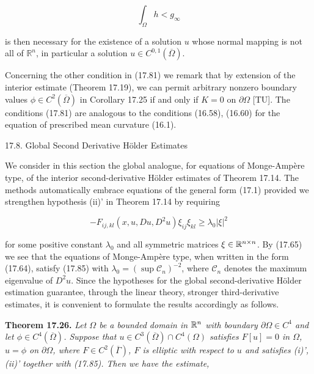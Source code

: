\begin{equation}
\tag{17.84}
\int_{\Omega} h < g_{\infty}
\end{equation}

is then necessary for the existence of a solution $u$ whose normal mapping is not all of $\mathbb{R}^n$, in particular a solution $u \in C^{0,1}(\overline{\Omega})$.

Concerning the other condition in (17.81) we remark that by extension of the interior estimate (Theorem 17.19), we can permit arbitrary nonzero boundary values $\phi \in C^2(\overline{\Omega})$ in Corollary 17.25 if and only if $K = 0$ on $\partial \Omega$ [TU]. The conditions (17.81) are analogous to the conditions (16.58), (16.60) for the equation of prescribed mean curvature (16.1).



17.8. Global Second Derivative Hölder Estimates

We consider in this section the global analogue, for equations of Monge-Ampère type, of the interior second-derivative Hölder estimates of Theorem 17.14. The methods automatically embrace equations of the general form (17.1) provided we strengthen hypothesis (ii)' in Theorem 17.14 by requiring

\begin{equation}
\tag{17.85}
-F_{ij,kl}(x,u,Du,D^2u)\xi_{ij}\xi_{kl} \geq \lambda_0|\xi|^2
\end{equation}

for some positive constant $\lambda_0$ and all symmetric matrices $\xi \in \mathbb{R}^{n \times n}$. By (17.65) we see that the equations of Monge-Ampère type, when written in the form (17.64), satisfy (17.85) with $\lambda_0 = (\sup \mathcal{C}_n)^{-2}$, where $\mathcal{C}_n$ denotes the maximum eigenvalue of $D^2u$. Since the hypotheses for the global second-derivative Hölder estimation guarantee, through the linear theory, stronger third-derivative estimates, it is convenient to formulate the results accordingly as follows.

\textbf{Theorem 17.26.} \emph{Let $\Omega$ be a bounded domain in $\mathbb{R}^n$ with boundary $\partial\Omega \in C^4$ and let $\phi \in C^4(\overline{\Omega})$. Suppose that $u \in C^3(\overline{\Omega}) \cap C^4(\Omega)$ satisfies $F[u] = 0$ in $\Omega$, $u = \phi$ on $\partial\Omega$, where $F \in C^2(\overline{\Gamma})$, $F$ is elliptic with respect to $u$ and satisfies (i)', (ii)' together with (17.85). Then we have the estimate,}

